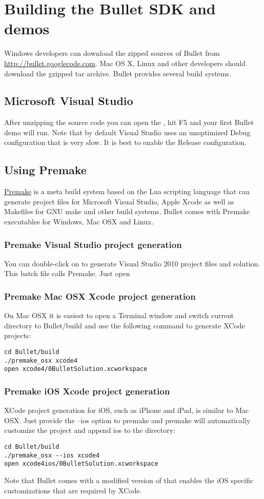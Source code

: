 \chapter{Building the Bullet SDK and demos}
Windows developers can download the zipped sources of Bullet from \url{http://bullet.googlecode.com}. Mac OS X, Linux and other developers should download the gzipped tar archive.
Bullet provides several build systems.

\section{Microsoft Visual Studio}
After unzipping the source code you can open the , hit F5 and your first Bullet demo will run. Note that by default Visual Studio uses an unoptimized Debug configuration that is very slow. It is best to enable the Release configuration.

\section{Using Premake}
\href{http://industriousone.com/premake}{Premake} is a meta build system based on the Lua scripting language that can generate project files for Microsoft Visual Studio, Apple Xcode as well as Makefiles for GNU make and other build systems. Bullet comes with Premake executables for Windows, Mac OSX and Linux.
\subsection{Premake Visual Studio project generation}
You can double-click on  to generate Visual Studio 2010 project files and solution. This batch file calls Premake. Just open 
\subsection{Premake Mac OSX Xcode project generation}
On Mac OSX it is easiest to open a Terminal window and switch current directory to Bullet/build and use the following command to generate XCode projects:
 \begin{lstlisting}[caption=Premake for Mac OSX, label=premake_osx]
cd Bullet/build
./premake_osx xcode4
open xcode4/0BulletSolution.xcworkspace
\end{lstlisting}

\subsection{Premake iOS Xcode project generation}
XCode project generation for iOS, such as iPhone and iPad, is similar to Mac OSX. Just provide the --ios option to premake and premake will automatically customize the project and append ios to the directory:
 \begin{lstlisting}[caption=Premake for iOS, label=premake_ios]
cd Bullet/build
./premake_osx --ios xcode4
open xcode4ios/0BulletSolution.xcworkspace
\end{lstlisting}
Note that Bullet comes with a modified version of  that enables the iOS specific customizations that are required by XCode.
